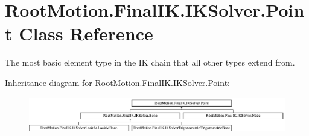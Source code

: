 \hypertarget{class_root_motion_1_1_final_i_k_1_1_i_k_solver_1_1_point}{}\section{Root\+Motion.\+Final\+I\+K.\+I\+K\+Solver.\+Point Class Reference}
\label{class_root_motion_1_1_final_i_k_1_1_i_k_solver_1_1_point}


The most basic element type in the IK chain that all other types extend from.  


Inheritance diagram for Root\+Motion.\+Final\+I\+K.\+I\+K\+Solver.\+Point\+:\begin{figure}[H]
\begin{center}
\leavevmode
\includegraphics[height=1.534247cm]{class_root_motion_1_1_final_i_k_1_1_i_k_solver_1_1_point}
\end{center}
\end{figure}
